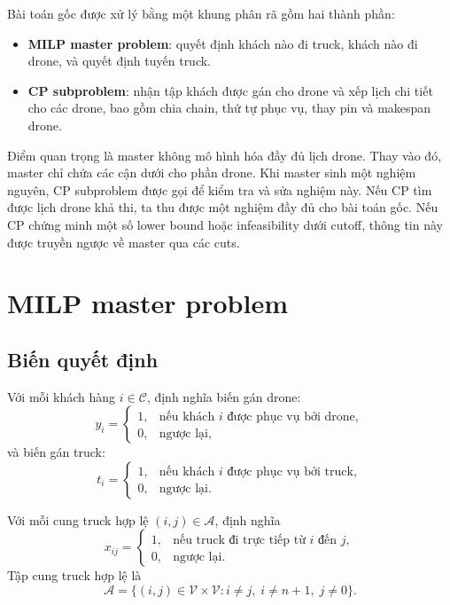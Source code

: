 \documentclass[12pt,a4paper]{article}
\newcommand{\C}{\mathcal{C}}
\newcommand{\A}{\mathcal{A}}
\newcommand{\V}{\mathcal{V}}
\begin{document}
Bài toán gốc được xử lý bằng một khung phân rã gồm hai thành phần:
\begin{itemize}[leftmargin=2em]
    \item \textbf{MILP master problem}: quyết định khách nào đi truck, khách nào đi drone, và quyết định tuyến truck.
    \item \textbf{CP subproblem}: nhận tập khách được gán cho drone và xếp lịch chi tiết cho các drone, bao gồm chia chain, thứ tự phục vụ, thay pin và makespan drone.
\end{itemize}

Điểm quan trọng là master không mô hình hóa đầy đủ lịch drone. Thay vào đó, master chỉ chứa các cận dưới cho phần drone. Khi master sinh một nghiệm nguyên, CP subproblem được gọi để kiểm tra và sửa nghiệm này. Nếu CP tìm được lịch drone khả thi, ta thu được một nghiệm đầy đủ cho bài toán gốc. Nếu CP chứng minh một số lower bound hoặc infeasibility dưới cutoff, thông tin này được truyền ngược về master qua các cuts.

\section{MILP master problem}
\label{sec:master}

\subsection{Biến quyết định}

Với mỗi khách hàng $i\in \C$, định nghĩa biến gán drone:
\[
    y_i=\begin{cases}
    1, & \text{nếu khách }i\text{ được phục vụ bởi drone},\\
    0, & \text{ngược lại},
    \end{cases}
\]
và biến gán truck:
\[
    t_i=\begin{cases}
    1, & \text{nếu khách }i\text{ được phục vụ bởi truck},\\
    0, & \text{ngược lại}.
    \end{cases}
\]

Với mỗi cung truck hợp lệ $(i,j)\in \A$, định nghĩa
\[
    x_{ij}=\begin{cases}
    1, & \text{nếu truck đi trực tiếp từ }i\text{ đến }j,\\
    0, & \text{ngược lại}.
    \end{cases}
\]
Tập cung truck hợp lệ là
\[
    \A=\{(i,j)\in \V\times \V: i\neq j,\; i\neq n+1,\; j\neq 0\}.
\]
\end{document}
